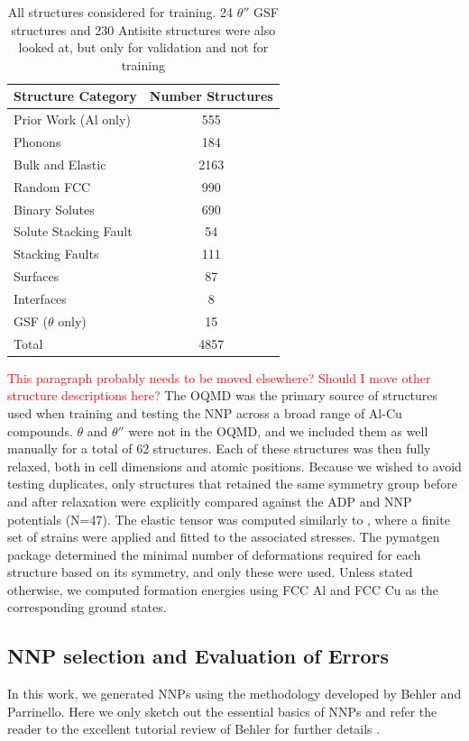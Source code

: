 \documentclass{article}
\begin{document}
\begin{table}[H]
\begin{tabular}{l|c}%
\hline%
Structure Category& Number Structures\\%
\hline%
Prior Work (Al only) &	555 \\
Phonons &	184 \\
Bulk and Elastic  &	2163 \\
Random FCC	& 990 \\
Binary Solutes & 	690 \\
Solute Stacking Fault &	54 \\
Stacking Faults &	111 \\
Surfaces &	87 \\
Interfaces &	8 \\
GSF ($\theta$ only)	 & 15 \\
\hline
Total &	4857 \\
\end{tabular}%
\caption{All structures considered for training. 24 $\theta''$ GSF structures and 230 Antisite structures were 
also looked at, but only for validation and not for training}
\label{table:included_structures}
\end{table}


\textcolor{red}{This paragraph probably needs to be moved elsewhere? 
Should I move other structure descriptions here?} The OQMD was the primary source of structures used when training and
testing the NNP across a broad range of Al-Cu compounds. $\theta$ and $\theta''$ were not in the OQMD, and we
included them as well manually for a total of 62 structures. Each of these structures was then fully relaxed, 
both in cell dimensions and atomic positions. Because we wished to avoid testing duplicates, only structures that retained the same symmetry group before and after relaxation were explicitly compared against the ADP and NNP
potentials (N=47). The elastic tensor was computed similarly to \cite{DeJong2015}, where a finite set of strains were
applied and fitted to the associated stresses. The pymatgen package\cite{Ong2013} determined the minimal number of
deformations required for each structure based on its symmetry, and only these were used. 
Unless stated otherwise, we computed formation energies using FCC Al and FCC Cu as the corresponding ground states. 

\subsection{NNP selection and Evaluation of Errors}
In this work, we generated NNPs using the methodology developed by Behler and Parrinello\cite{Behler2007}.
Here we only sketch out the essential basics of NNPs and refer the reader to the excellent tutorial review of Behler for further details \cite{Behler2015}. 
\end{document}
